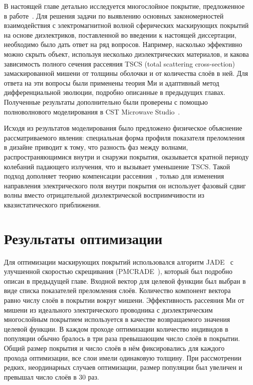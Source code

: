 В настоящей главе детально исследуется многослойное покрытие,
предложенное в работе~\cite{Semouchkina-2013}. Для решения задачи по
выявлению основных закономерностей взаимодействия с электромагнитной
волной сферических маскирующих покрытий на основе диэлектриков,
поставленной во введении к настоящей диссертации, необходимо было дать
ответ на ряд вопросов. Например, насколько эффективно можно
скрыть объект, используя несколько диэлектрических материалов, и
какова зависимость полного сечения рассеяния TSCS (total scattering
cross-section) замаскированной мишени от толщины оболочки и от
количества слоёв в ней. Для ответа на эти вопросы были применены
теория Ми и адаптивный метод дифференциальной эволюции, подробно
описанные в предыдущих главах. Полученные результаты дополнительно
были проверены с помощью полноволнового моделирования в CST Microwave
Studio~\cite{CST-web}.
 
Исходя из результатов моделирования было предложено физическое
объяснение рассматриваемого явления: специальная форма профиля
показателя преломления в дизайне приводит к тому, что
разность фаз между волнами, распространяющимися внутри и снаружи
покрытия, оказывается кратной периоду колебаний падающего излучения, что и
вызывает уменьшение TSCS. Такой подход дополняет теорию компенсации
рассеяния~\cite{alu}, только для изменения направления электрического
поля внутри покрытия он использует фазовый сдвиг волны вместо
отрицательной диэлектрической восприимчивости из квазистатического
приближения.

\section{Результаты оптимизации}  
Для оптимизации маскирующих покрытий использовался
алгоритм JADE~\cite{Jingqiao-JADE-2009} с улучшенной скоростью
скрещивания (PMCRADE~\cite{Li-PMCRADE-2011}), который был подробно
описан в предыдущей главе.  Входной вектор для целевой функции был
выбран в виде списка показателей преломления слоёв. Количество
компонент вектора равно числу слоёв в покрытии вокруг
мишени. Эффективность рассеяния Ми от мишени из идеального
электрического проводника с диэлектрическим многослойным покрытием
используется в качестве возвращаемого значения целевой функции. В
каждом проходе оптимизации количество индивидов в популяции обычно
бралось в три раза превышающим число слоёв в покрытии. Общий размер
покрытия и число слоёв в нём фиксировались для каждого прохода
оптимизации, все слои имели одинаковую толщину. При
рассмотрении редких, неординарных случаев оптимизации, размер
популяции был увеличен и превышал число слоёв в 30 раз.
 

